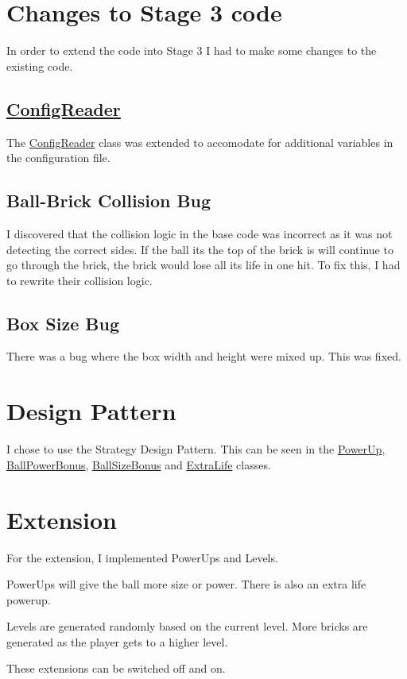 \section*{Changes to Stage 3 code }

In order to extend the code into Stage 3 I had to make some changes to the existing code.

\subsection*{\hyperlink{class_config_reader}{Config\+Reader} }

The \hyperlink{class_config_reader}{Config\+Reader} class was extended to accomodate for additional variables in the configuration file.

\subsection*{Ball-\/\+Brick Collision Bug }

I discovered that the collision logic in the base code was incorrect as it was not detecting the correct sides. If the ball its the top of the brick is will continue to go through the brick, the brick would lose all its life in one hit. To fix this, I had to rewrite their collision logic.

\subsection*{Box Size Bug }

There was a bug where the box width and height were mixed up. This was fixed.

\section*{Design Pattern }

I chose to use the Strategy Design Pattern. This can be seen in the \hyperlink{class_power_up}{Power\+Up}, \hyperlink{class_ball_power_bonus}{Ball\+Power\+Bonus}, \hyperlink{class_ball_size_bonus}{Ball\+Size\+Bonus} and \hyperlink{class_extra_life}{Extra\+Life} classes.

\section*{Extension }

For the extension, I implemented Power\+Ups and Levels.

Power\+Ups will give the ball more size or power. There is also an extra life powerup.

Levels are generated randomly based on the current level. More bricks are generated as the player gets to a higher level.

These extensions can be switched off and on. 